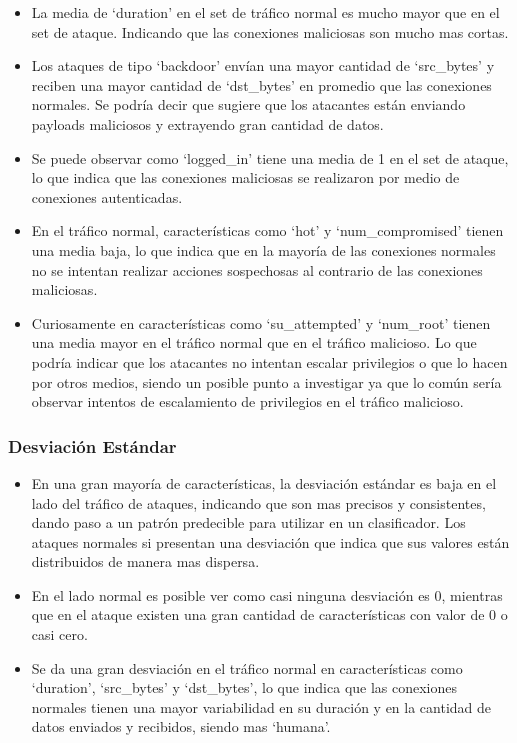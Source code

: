 \documentclass[12pt,a4paper]{article}
\begin{document}
\begin{itemize}
  \item La media de `duration' en el set de tráfico normal es mucho mayor que en el set de ataque.
    Indicando que las conexiones maliciosas son mucho mas cortas.
  \item Los ataques de tipo `backdoor' envían una mayor cantidad de `src_bytes' y reciben una mayor cantidad de `dst_bytes' en promedio que las conexiones normales.
    Se podría decir que sugiere que los atacantes están enviando payloads maliciosos y extrayendo gran cantidad de datos.
  \item Se puede observar como `logged_in' tiene una media de 1 en el set de ataque, lo que indica que las conexiones maliciosas se realizaron por medio de conexiones autenticadas.
  \item En el tráfico normal, características como `hot' y `num_compromised' tienen una media baja, lo que indica que en la mayoría de las conexiones normales no se intentan realizar acciones sospechosas al contrario de las conexiones maliciosas.
  \item Curiosamente en características como `su_attempted' y `num_root' tienen una media mayor en el tráfico normal que en el tráfico malicioso.
    Lo que podría indicar que los atacantes no intentan escalar privilegios o que lo hacen por otros medios, siendo un posible punto a investigar ya que lo común sería observar intentos de escalamiento de privilegios en el tráfico malicioso.
\end{itemize}

\subsubsection{Desviación Estándar}

\begin{itemize}
  \item En una gran mayoría de características, la desviación estándar es baja en el lado del tráfico de ataques, indicando que son mas precisos y consistentes, dando paso a un patrón predecible para utilizar en un clasificador.
    Los ataques normales si presentan una desviación que indica que sus valores están distribuidos de manera mas dispersa.
  \item En el lado normal es posible ver como casi ninguna desviación es 0, mientras que en el ataque existen una gran cantidad de características con valor de 0 o casi cero.
  \item Se da una gran desviación en el tráfico normal en características como `duration', `src_bytes' y `dst_bytes', lo que indica que las conexiones normales tienen una mayor variabilidad en su duración y en la cantidad de datos enviados y recibidos, siendo mas `humana'.
\end{itemize}
\end{document}
